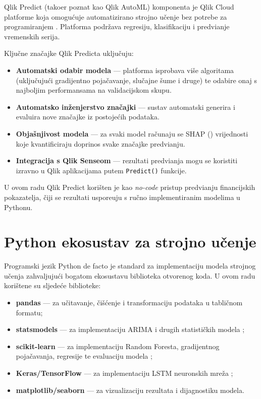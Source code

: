 \documentclass[zavrsnirad]{fer}
\begin{document}
Qlik Predict (tako\dj er poznat kao Qlik AutoML) komponenta je Qlik Cloud platforme koja omogu\'{c}uje automatizirano strojno u\v{c}enje bez potrebe za programiranjem \citep{qlikpredict2024}. Platforma podr\v{z}ava regresiju, klasifikaciju i predvi\dj anje vremenskih serija.

Klju\v{c}ne zna\v{c}ajke Qlik Predicta uklju\v{c}uju:
\begin{itemize}
    \item \textbf{Automatski odabir modela} --- platforma isprobava vi\v{s}e algoritama (uklju\v{c}uju\'{c}i gradijentno poja\v{c}avanje, slu\v{c}ajne \v{s}ume i druge) te odabire onaj s najboljim performansama na validacijskom skupu.
    \item \textbf{Automatsko in\v{z}enjerstvo zna\v{c}ajki} --- sustav automatski generira i evaluira nove zna\v{c}ajke iz postoje\'{c}ih podataka.
    \item \textbf{Obja\v{s}njivost modela} --- za svaki model ra\v{c}unaju se SHAP () vrijednosti koje kvantificiraju doprinos svake zna\v{c}ajke predvi\dj anju.
    \item \textbf{Integracija s Qlik Senseom} --- rezultati predvi\dj anja mogu se koristiti izravno u Qlik aplikacijama putem \texttt{Predict()} funkcije.
\end{itemize}

U ovom radu Qlik Predict kori\v{s}ten je kao \textit{no-code} pristup predvi\dj anju financijskih pokazatelja, \v{c}iji se rezultati uspore\dj uju s ru\v{c}no implementiranim modelima u Pythonu.

\section{Python ekosustav za strojno u\v{c}enje}
\label{sec:python_ml}

Programski jezik Python de facto je standard za implementaciju modela strojnog u\v{c}enja zahvaljuju\'{c}i bogatom ekosustavu biblioteka otvorenog koda. U ovom radu kori\v{s}tene su sljede\'{c}e biblioteke:

\begin{itemize}
    \item \textbf{pandas} --- za u\v{c}itavanje, \v{c}i\v{s}\'{c}enje i transformaciju podataka u tabli\v{c}nom formatu;
    \item \textbf{statsmodels} --- za implementaciju ARIMA i drugih statisti\v{c}kih modela \citep{statsmodels2024};
    \item \textbf{scikit-learn} --- za implementaciju Random Foresta, gradijentnog poja\v{c}avanja, regresije te evaluaciju modela \citep{scikitlearn2024};
    \item \textbf{Keras/TensorFlow} --- za implementaciju LSTM neuronskih mre\v{z}a \citep{keras2024};
    \item \textbf{matplotlib/seaborn} --- za vizualizaciju rezultata i dijagnostiku modela.
\end{itemize}
\end{document}

